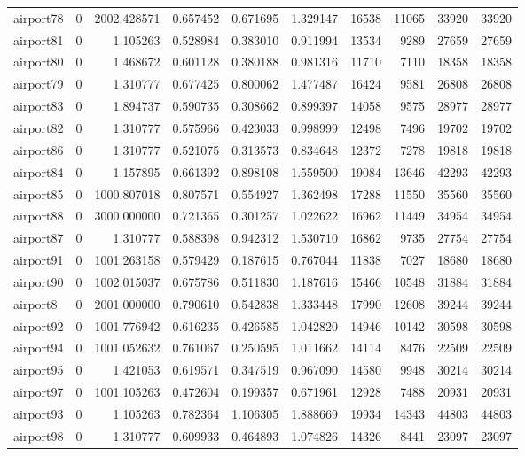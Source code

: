 \begin{longtable}{|l|r|r|r|r|r|r|r|r|r|}
airport78 & 0 & 2002.428571 & 0.657452 & 0.671695 & 1.329147 & 16538 & 11065 & 33920 & 33920 \\
airport81 & 0 & 1.105263 & 0.528984 & 0.383010 & 0.911994 & 13534 & 9289 & 27659 & 27659 \\
airport80 & 0 & 1.468672 & 0.601128 & 0.380188 & 0.981316 & 11710 & 7110 & 18358 & 18358 \\
airport79 & 0 & 1.310777 & 0.677425 & 0.800062 & 1.477487 & 16424 & 9581 & 26808 & 26808 \\
airport83 & 0 & 1.894737 & 0.590735 & 0.308662 & 0.899397 & 14058 & 9575 & 28977 & 28977 \\
airport82 & 0 & 1.310777 & 0.575966 & 0.423033 & 0.998999 & 12498 & 7496 & 19702 & 19702 \\
airport86 & 0 & 1.310777 & 0.521075 & 0.313573 & 0.834648 & 12372 & 7278 & 19818 & 19818 \\
airport84 & 0 & 1.157895 & 0.661392 & 0.898108 & 1.559500 & 19084 & 13646 & 42293 & 42293 \\
airport85 & 0 & 1000.807018 & 0.807571 & 0.554927 & 1.362498 & 17288 & 11550 & 35560 & 35560 \\
airport88 & 0 & 3000.000000 & 0.721365 & 0.301257 & 1.022622 & 16962 & 11449 & 34954 & 34954 \\
airport87 & 0 & 1.310777 & 0.588398 & 0.942312 & 1.530710 & 16862 & 9735 & 27754 & 27754 \\
airport91 & 0 & 1001.263158 & 0.579429 & 0.187615 & 0.767044 & 11838 & 7027 & 18680 & 18680 \\
airport90 & 0 & 1002.015037 & 0.675786 & 0.511830 & 1.187616 & 15466 & 10548 & 31884 & 31884 \\
airport8 & 0 & 2001.000000 & 0.790610 & 0.542838 & 1.333448 & 17990 & 12608 & 39244 & 39244 \\
airport92 & 0 & 1001.776942 & 0.616235 & 0.426585 & 1.042820 & 14946 & 10142 & 30598 & 30598 \\
airport94 & 0 & 1001.052632 & 0.761067 & 0.250595 & 1.011662 & 14114 & 8476 & 22509 & 22509 \\
airport95 & 0 & 1.421053 & 0.619571 & 0.347519 & 0.967090 & 14580 & 9948 & 30214 & 30214 \\
airport97 & 0 & 1001.105263 & 0.472604 & 0.199357 & 0.671961 & 12928 & 7488 & 20931 & 20931 \\
airport93 & 0 & 1.105263 & 0.782364 & 1.106305 & 1.888669 & 19934 & 14343 & 44803 & 44803 \\
airport98 & 0 & 1.310777 & 0.609933 & 0.464893 & 1.074826 & 14326 & 8441 & 23097 & 23097 \\

\end{longtable}
